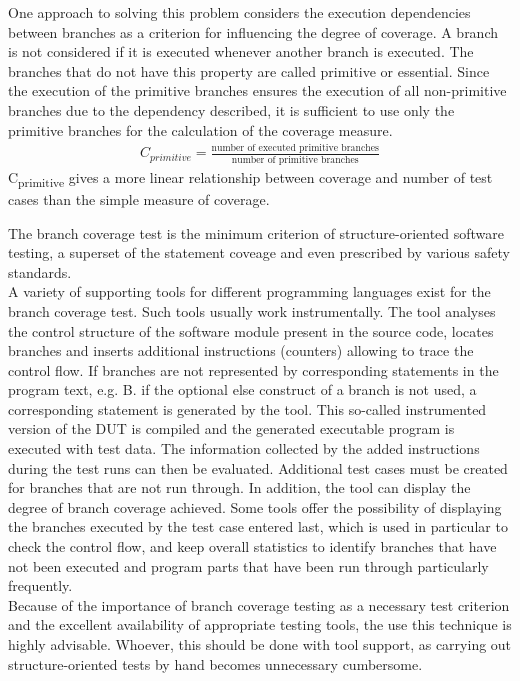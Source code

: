 	One approach to solving this problem considers the execution dependencies between branches as a criterion for influencing the degree of coverage. A branch is not considered if it is executed whenever another branch is executed. The branches that do not have this property are called primitive or essential. Since the execution of the primitive branches ensures the execution of all non-primitive branches due to the dependency described, it is sufficient to use only the primitive branches for the calculation of the coverage measure.
	\begin{align*}
		C_{primitive} = \frac{\textrm{number of executed primitive branches}}{\textrm{number of primitive branches}}
	\end{align*}
	C\textsubscript{primitive} gives a more linear relationship between coverage and number of test cases than the simple measure of coverage. 

	The branch coverage test is the minimum criterion of structure-oriented software testing, a superset of the statement coveage and even prescribed by various safety standards. \\
	A variety of supporting tools for different programming languages exist for the branch coverage test. Such tools usually work instrumentally. The tool analyses the control structure of the software module present in the source code, locates branches and inserts additional instructions (counters) allowing to trace the control flow. If branches are not represented by corresponding statements in the program text, e.g. B. if the optional else construct of a branch is not used, a corresponding statement is generated by the tool. This so-called instrumented version of the DUT is compiled and the generated executable program is executed with test data. The information collected by the added instructions during the test runs can then be evaluated. Additional test cases must be created for branches that are not run through. In addition, the tool can display the degree of branch coverage achieved. Some tools offer the possibility of displaying the branches executed by the test case entered last, which is used in particular to check the control flow, and keep overall statistics to identify branches that have not been executed and program parts that have been run through particularly frequently. \\
	Because of the importance of branch coverage testing as a necessary test criterion and the excellent availability of appropriate testing tools, the use this technique is highly advisable. Whoever, this should be done with tool support, as carrying out structure-oriented tests by hand becomes unnecessary cumbersome.

